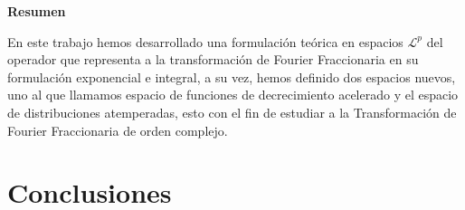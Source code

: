 \documentclass[letterpaper]{report}
\begin{document}
\tableofcontents
\clearpage

\listoffigures
\clearpage

\vspace*{2cm}
\begin{flushleft}
    {\huge\bfseries Resumen\par}
    \vspace{0.5cm}
    En este trabajo hemos desarrollado una formulación teórica en espacios $\mathcal{L}^p$ del operador que representa a la transformación de Fourier Fraccionaria en su formulación exponencial e integral, a su vez, hemos definido dos espacios nuevos, uno al que llamamos espacio de funciones de decrecimiento acelerado y el espacio de distribuciones atemperadas, esto con el fin de estudiar a la Transformación de Fourier Fraccionaria de orden complejo. 
\end{flushleft}
\clearpage






\chapter{Conclusiones}
\lipsum[9-10]

\renewcommand{\bibname}{Referencias}

\end{document}
